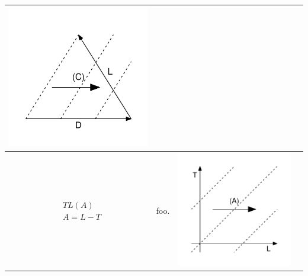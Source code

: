\documentclass[
  12pt
]{scrartcl}
\begin{document}
\begin{center}
\begin{longtable}{m{}m{}m{}m{}}
  \includegraphics[width = \linewidth]{../fig/LDc_iso.pdf}  \\
  \midrule
  $$\begin{aligned}
    &TL(A) \\
    &A = L - T
  \end{aligned}$$ &
  foo. &
  \includegraphics[width = \linewidth]{../fig/TLa.pdf} &

\end{longtable}
\end{center}
\end{document}
